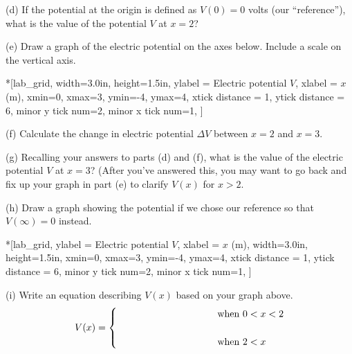 (d) If the potential at the origin is defined as $V(0)=0$ volts (our ``reference''), what is the value of the potential $V$ at $x=2$?
\answerspace{0.7in}

\pagebreak
(e) Draw a graph of the electric potential on the axes below.  Include a scale on the vertical axis.

\begin{lab_axis}*[lab_grid,
	width={3.0in}, height={1.5in},
	ylabel = {Electric potential $V$},
	xlabel = {$x$ (m)},
	xmin=0, xmax=3,
	ymin=-4, ymax=4,
	xtick distance = 1,
	ytick distance = 6,
	minor y tick num=2,
	minor x tick num=1,
]
\end{lab_axis}

(f) Calculate the change in electric potential $\Delta V$ between $x=2$ and $x=3$.
\answerspace{0.5in}

(g) Recalling your answers to parts (d) and (f), what is the value of the electric potential $V$ at $x=3$?  (After you've answered this, you may want to go back and fix up your graph in part (e) to clarify $V(x)$ for $x>2$.
\answerspace{0.5in}

(h) Draw a graph showing the potential if we chose our reference so that $V(\infty)=0$ instead.  

\begin{lab_axis}*[lab_grid,
	ylabel = {Electric potential $V$},
	xlabel = {$x$ (m)},
	width={3.0in}, height={1.5in},
	xmin=0, xmax=3,
	ymin=-4, ymax=4,
	xtick distance = 1,
	ytick distance = 6,
	minor y tick num=2,
	minor x tick num=1,
]
\end{lab_axis}

(i) Write an equation describing $V(x)$ based on your graph above.
\begin{displaymath}
V(x) = \begin{cases}
        \rule{1.3in}{0in}  & \textrm{when } 0<x<2\\
        \\
        \hspace{1.3in} & \textrm{when }  2 < x
        \end{cases}
\end{displaymath}
\answerspace{0.1in}

